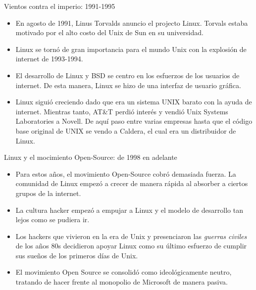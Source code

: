 \documentclass[11pt]{beamer}
\begin{document}
		\begin{frame}{Vientos contra el imperio: 1991-1995}
			\begin{itemize}
				\item En agosto de 1991, Linus Torvalds anuncio el projecto Linux. Torvals estaba motivado por el alto costo del Unix de Sun en su universidad.
				\item Linux se tornó de gran importancia para el mundo Unix con la explosión de internet de 1993-1994.
				\item El desarrollo de Linux y BSD se centro en los esfuerzos de los usuarios de internet. De esta manera, Linux se hizo de una interfaz de usuario gráfica.
				\item Linux siguió creciendo dado que era un sistema UNIX barato con la ayuda de internet. Mientras tanto, AT\&T perdió interés y vendió Unix Systems Laboratories a Novell. De aquí paso entre varias empresas hasta que el código base original de UNIX se vendo a Caldera, el cual era un distribuidor de Linux. 
			\end{itemize}
		\end{frame}
		\begin{frame}{Linux y el mocimiento Open-Source: de 1998 en adelante}
			\begin{itemize}
				\item Para estos años, el movimiento Open-Source cobró demasiada fuerza. La comunidad de Linux empezó a crecer de manera rápida al absorber a ciertos grupos de la internet.
				\item La cultura hacker empezó a empujar a Linux y el modelo de desarrollo tan lejos como se pudiera ir.
				\item Los hackers que vivieron en la era de Unix y presenciaron las \textit{guerras civiles} de los años 80s decidieron apoyar Linux como su último esfuerzo de cumplir sus sueños de los primeros días de Unix.	
				\item El movimiento Open Source se consolidó como ideológicamente neutro, tratando de hacer frente al monopolio de Microsoft de manera pasiva. 		
			\end{itemize}
		\end{frame}
\end{document}

